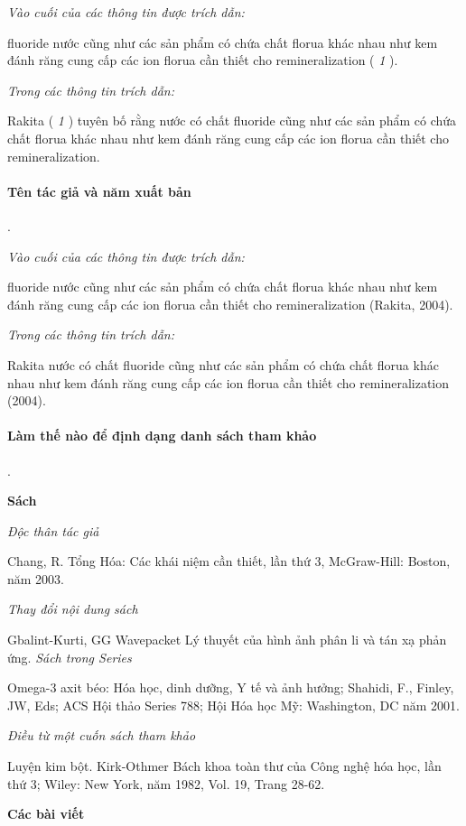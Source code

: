 \documentclass{hcmutarticle}
\begin{document}
{\em Vào cuối của các thông tin được trích dẫn:}

fluoride nước cũng như các sản phẩm có chứa chất florua khác nhau như kem đánh răng cung cấp các ion florua cần thiết cho remineralization ( {\itshape 1} ).

{\em Trong các thông tin trích dẫn:}

Rakita ( {\itshape 1} ) tuyên bố rằng nước có chất fluoride cũng như các sản phẩm có chứa chất florua khác nhau như kem đánh răng cung cấp các ion florua cần thiết cho remineralization.


\paragraph{Tên tác giả và năm xuất bản}.

{\em Vào cuối của các thông tin được trích dẫn:}

fluoride nước cũng như các sản phẩm có chứa chất florua khác nhau như kem đánh răng cung cấp các ion florua cần thiết cho remineralization (Rakita, 2004).

{\em Trong các thông tin trích dẫn:}

Rakita nước có chất fluoride cũng như các sản phẩm có chứa chất florua khác nhau như kem đánh răng cung cấp các ion florua cần thiết cho remineralization (2004).

\paragraph{Làm thế nào để định dạng danh sách tham khảo}.

{\bfseries Sách}

{\em Độc thân tác giả}

Chang, R. Tổng Hóa: Các khái niệm cần thiết, lần thứ 3, McGraw-Hill: Boston, năm 2003.

{\em Thay đổi nội dung sách}

Gbalint-Kurti, GG Wavepacket Lý thuyết của hình ảnh phân li và tán xạ phản ứng. 
{\em Sách trong Series}

Omega-3 axit béo: Hóa học, dinh dưỡng, Y tế và ảnh hưởng; Shahidi, F., Finley, JW, Eds; ACS Hội thảo Series 788; Hội Hóa học Mỹ: Washington, DC năm 2001.

{\em Điều từ một cuốn sách tham khảo}

Luyện kim bột. Kirk-Othmer Bách khoa toàn thư của Công nghệ hóa học, lần thứ 3; Wiley: New York, năm 1982, Vol. 19, Trang 28-62.

{\bfseries Các bài viết}
\end{document}
